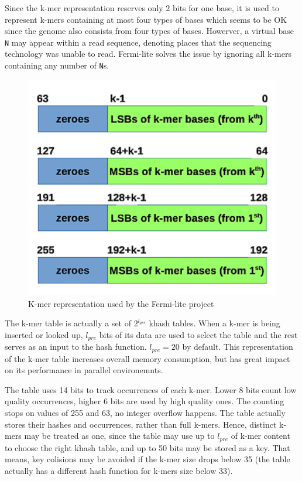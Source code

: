 Since the k-mer representation reserves only 2 bits for one base, it is used to represent k-mers containing at most four types of bases which seems to be OK since the genome also consists from four types of bases. Howerver, a virtual base \texttt{N} may appear within a read sequence, denoting places that the sequencing technology was unable to read. Fermi-lite solves the issue by ignoring all k-mers containing any number of \texttt{N}s.

\begin{figure}[h]
	\centering
	\includegraphics{img/fermi-kmer-structure.pdf}
	\caption{K-mer representation used by the Fermi-lite project}
	\label{fig:fermi-kmer-structure}
\end{figure}

The k-mer table is actually a set of $2^{l_{pre}}$ khash tables. When a k-mer is being inserted or looked up, $l_{pre}$ bits of its data are used to select the table and the rest serves as an input to the hash function. $l_{pre} = 20$ by default. This representation of the k-mer table increases overall memory consumption, but has great impact on its performance in parallel environemnts. 

The table uses 14 bits to track occurrences of each k-mer. Lower 8 bits count low quality occurrences, higher 6 bits are used by high quality ones. The counting stops on values of 255 and 63, no integer overflow happens. The table actually stores their hashes and occurrences, rather than full k-mers. Hence, distinct k-mers may be treated as one, since the table may use up to $l_{pre}$ of k-mer content to choose the right khash table, and up to 50 bits may be stored as a key. That means, key colisions may be avoided if the k-mer size drops below 35 (the table actually has a different hash function for k-mers size below 33).

